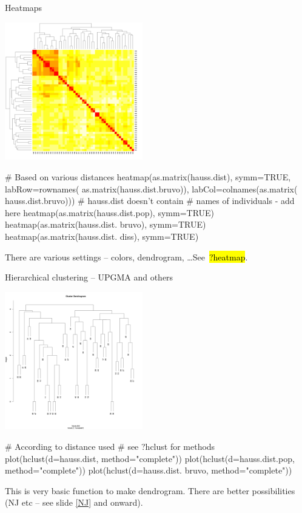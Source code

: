 \documentclass[compress, ucs, xelatex, 11pt, xcolor=svgnames,
  hyperref={
    bookmarks=true,
    unicode=true,
    colorlinks=true,
    pdftitle={Molecular data in R},
    plainpages=false,
    pdfauthor={Vojtech Zeisek},
    pdfsubject={Course about phylogeny and evolution in R},
    pdfcreator={XeLaTeX},
    pdfkeywords={R, evolution, phylogeny, molecular data},
    linkcolor=Tomato,
    anchorcolor=SaddleBrown,
    citecolor=Goldenrod,
    filecolor=DarkMagenta,
    menucolor=Sienna,
    urlcolor=DarkTurquoise,
    pdftex},
  url={hyphens, lowtilde} %
  ]{beamer}
\renewcommand{\texttt}[1]{\hl{\ttfamily #1}}
\begin{document}
\begin{frame}[fragile]{Heatmaps}
\begin{multicols}{2}
  \includegraphics[height=6cm]{heatmap.png}
  \columnbreak
  \begin{spluscode}
    # Based on various distances
    heatmap(as.matrix(hauss.dist),
      symm=TRUE, labRow=rownames(
      as.matrix(hauss.dist.bruvo)),
      labCol=colnames(as.matrix(
      hauss.dist.bruvo)))
      # hauss.dist doesn't contain
      # names of individuals - add here
    heatmap(as.matrix(hauss.dist.pop),
      symm=TRUE)
    heatmap(as.matrix(hauss.dist.
      bruvo), symm=TRUE)
    heatmap(as.matrix(hauss.dist.
      diss), symm=TRUE)
  \end{spluscode}
  \begin{footnotesize}
  There are various settings -- colors, dendrogram, \ldots See~\texttt{?heatmap}.
  \end{footnotesize}
\end{multicols}
\end{frame}

\begin{frame}[fragile]{Hierarchical clustering -- UPGMA and others}
\begin{multicols}{2}
  \includegraphics[height=6cm]{hierclust.png}
  \begin{spluscode}
    # According to distance used
    # see ?hclust for methods
    plot(hclust(d=hauss.dist,
      method="complete"))
    plot(hclust(d=hauss.dist.pop,
      method="complete"))
    plot(hclust(d=hauss.dist.
      bruvo, method="complete"))
  \end{spluscode}
  \vfil
  This is very basic function to make dendrogram. There are better possibilities (NJ etc -- see slide \ref{NJ} and onward).
\end{multicols}
\end{frame}
\end{document}
